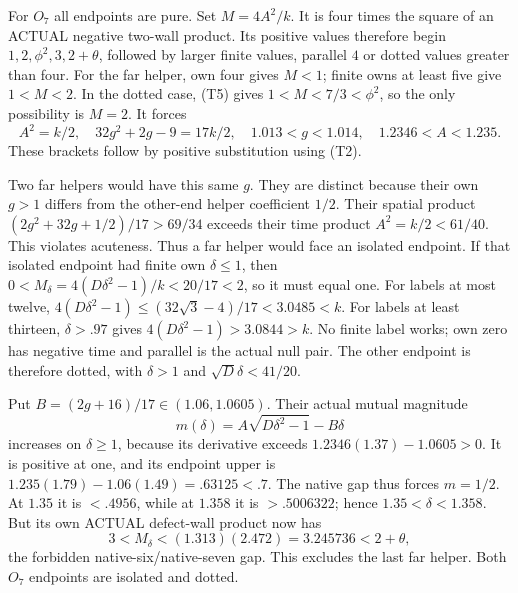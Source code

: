\documentclass[11pt]{article}
\theoremstyle{definition}
\theoremstyle{remark}
\begin{document}
For \(O_7\) all endpoints are pure.  Set \(M=4A^2/k\).
It is four times the square of an ACTUAL negative two-wall product.
Its positive values therefore begin
\(1,2,\phi^2,3,2+\theta\), followed by larger finite values,
parallel \(4\) or dotted values greater than four.
For the far helper, own four gives \(M<1\); finite owns at least
five give \(1<M<2\).  In the dotted case, (T5) gives
\(1<M<7/3<\phi^2\), so the only possibility is \(M=2\).
It forces
\[
 A^2=k/2,\quad 32g^2+2g-9=17k/2,\quad
 1.013<g<1.014,\quad1.2346<A<1.235.                 \tag{T6}
\]
These brackets follow by positive substitution using (T2).

Two far helpers would have this same \(g\).  They are distinct because
their own \(g>1\) differs from the other-end helper coefficient \(1/2\).
Their spatial
product \((2g^2+32g+1/2)/17>69/34\) exceeds their time product
\(A^2=k/2<61/40\).  This violates acuteness.  Thus a far helper
would face an isolated endpoint.
If that isolated endpoint had finite own \(\delta\le1\), then
\(0<M_\delta=4(D\delta^2-1)/k<20/17<2\), so it must equal one.
For labels at most twelve,
\(4(D\delta^2-1)\le(32\sqrt3-4)/17<3.0485<k\).
For labels at least thirteen, \(\delta>.97\) gives
\(4(D\delta^2-1)>3.0844>k\).  No finite label works; own zero
has negative time and parallel is the actual null pair.
The other endpoint is therefore dotted, with \(\delta>1\) and
\(\sqrt D\delta<41/20\).

Put \(B=(2g+16)/17\in(1.06,1.0605)\).
Their actual mutual magnitude
\[
 m(\delta)=A\sqrt{D\delta^2-1}-B\delta
\]
increases on \(\delta\ge1\), because its derivative exceeds
\(1.2346(1.37)-1.0605>0\).
It is positive at one, and its endpoint upper is
\(1.235(1.79)-1.06(1.49)=.63125<.7\).
The native gap thus forces \(m=1/2\).
At \(1.35\) it is \(<.4956\), while at \(1.358\) it is
\(>.5006322\); hence \(1.35<\delta<1.358\).
But its own ACTUAL defect-wall product now has
\[
 3<M_\delta<(1.313)(2.472)=3.245736<2+\theta,
\]
the forbidden native-six/native-seven gap.  This excludes the last
far helper.  Both \(O_7\) endpoints are isolated and dotted.
\end{document}
